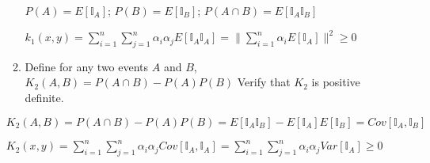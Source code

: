 \documentclass[11pt]{article}
\begin{document}
\begin{enumerate}
\begin{enumerate}
$P(A)=E[\mathbb{I}_A]$; $P(B)=E[\mathbb{I}_B]$; $P(A\cap B)=E[\mathbb{I}_A\mathbb{I}_B]$

$k_1(x,y)=\sum_{i=1}^n\sum_{j=1}^n\alpha_i\alpha_jE[\mathbb{I}_A\mathbb{I}_A]=\|\sum_{i=1}^n\alpha_iE[\mathbb{I}_A]\|^2\ge0$
\vspace{5mm}

\item Define for any two events $A$ and $B$, 
$K_2(A,B)=P(A \cap B)-P(A)P(B)$
Verify that $K_2$ is positive definite. 
\end{enumerate}

\vspace{5mm}
$K_2(A,B)=P(A \cap B)-P(A)P(B)=E[\mathbb{I}_A\mathbb{I}_B]-E[\mathbb{I}_A]E[\mathbb{I}_B]=Cov[\mathbb{I}_A,\mathbb{I}_B]$

$K_2(x,y)=\sum_{i=1}^n\sum_{j=1}^n\alpha_i\alpha_jCov[\mathbb{I}_A,\mathbb{I}_A]=\sum_{i=1}^n\sum_{j=1}^n\alpha_i\alpha_jVar[\mathbb{I}_A]\ge 0$
\vspace{5mm}



\end{enumerate}
\end{document}
